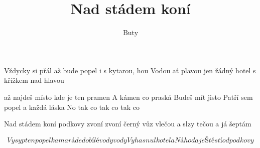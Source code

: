 \documentclass[columns]{song}
\title{Nad stádem koní}
\author{Buty}
\begin{document}


Vždycky si přál
až bude popel
i s kytarou, hou
Vodou ať plavou
jen žádný hotel
s křížkem nad hlavou

až najdeš místo
kde je ten pramen
A kámen co praská
Budeš mít jisto
Patří  sem popel
a každá láska
No tak co
tak co
tak co

Nad stádem koní
podkovy zvoní zvoní
černý vůz vlečou
a slzy tečou
a já šeptám

\[ Vysyp ten popel
kamaráde
do bílé vody vody
Vyhasnul kotel
a Náhoda
je Štěstí od podkovy \]
\end{document}
